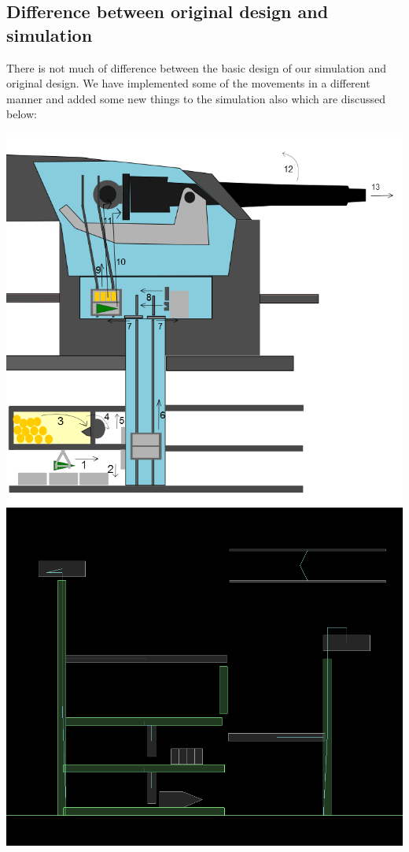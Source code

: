 \documentclass[11pt]{article}
\begin{document}
\subsection{Difference between original design and simulation}
There is not much of difference between the basic design of our simulation and original design.
We have implemented some of the movements in a different manner and added some new things to the simulation also
which are discussed below:
 \begin{center}
 \includegraphics[scale=0.3]{./images/original}
 \includegraphics[scale=0.25]{./images/simulation}
 \end{center}
\end{document}
